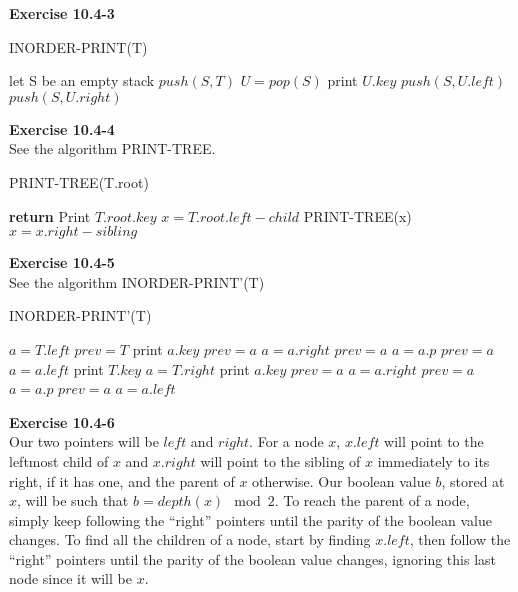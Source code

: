 \documentclass{article}
\begin{document}
\noindent\textbf{ Exercise 10.4-3} \\
\begin{algorithm}
\caption{INORDER-PRINT(T)}
\begin{algorithmic}
\State let S be an empty stack
\State $push(S,T)$
\State $U = pop(S)$
\State print $U.key$
\State $push(S,U.left)$
\State $push(S,U.right)$
\EndIf
\EndWhile
\end{algorithmic}
\end{algorithm}

\noindent\textbf{Exercise 10.4-4}\\

See the algorithm PRINT-TREE.

\begin{algorithm}
\caption{PRINT-TREE(T.root)}
\begin{algorithmic}
	\State \textbf{return}
\Else
	\State Print $T.root.key$
	\State $x = T.root.left-child$
		\State PRINT-TREE(x)
		\State $x = x.right-sibling$
	\EndWhile
\EndIf
\end{algorithmic}
\end{algorithm}

\noindent\textbf{ Exercise 10.4-5} \\
See the algorithm INORDER-PRINT'(T)
\begin{algorithm}
\caption{INORDER-PRINT'(T)}
\begin{algorithmic}
\State $a = T.left$
\State $prev = T$
\State print $a.key$
\State $prev = a$
\State $a = a.right$
\State $prev = a$
\State $a = a.p$
\State $prev = a$
\State $a = a.left$
\EndIf
\EndWhile
\State print $T.key$
\State $a = T.right$
\State print $a.key$
\State $prev = a$
\State $a = a.right$
\State $prev = a$
\State $a = a.p$
\State $prev = a$
\State $a = a.left$
\EndIf
\EndWhile
\end{algorithmic}
\end{algorithm}

\noindent\textbf{Exercise 10.4-6}\\

Our two pointers will be $left$ and $right$.  For a node $x$, $x.left$ will point to the leftmost child of $x$ and $x.right$ will point to the sibling of $x$ immediately to its right, if it has one, and the parent of $x$ otherwise.  Our boolean value $b$, stored at $x$, will be such that $b = depth(x) \mod 2$.  To reach the parent of a node, simply keep following the ``right'' pointers until the parity of the boolean value changes.  To find all the children of a node, start by finding $x.left$, then follow the ``right'' pointers until the parity of the boolean value changes, ignoring this last node since it will be $x$.
\end{document}
